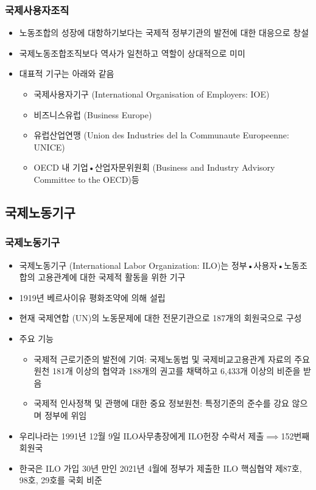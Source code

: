 \documentclass[aspectratio=169,xcolor=dvipsnames,handout]{beamer}
\begin{document}
\begin{frame}
    \frametitle{국제사용자조직}
    \begin{itemize}[<+->]
        \item 노동조합의 성장에 대항하기보다는 국제적 정부기관의 발전에 대한 대응으로 창설
        \item 국제노동조합조직보다 역사가 일천하고 역할이 상대적으로 미미
        \item 대표적 기구는 아래와 같음
        \begin{itemize}
            \item 국제사용자기구 (International Organisation of Employers: IOE)
            \item 비즈니스유럽 (Business Europe)
            \item 유럽산업연맹 (Union des Industries del la Communaute Europeenne: UNICE)
            \item OECD 내 기업•산업자문위원회 (Business and Industry Advisory Committee to the OECD)등
        \end{itemize}
    \end{itemize}
\end{frame}

\subsection{국제노동기구}%

\begin{frame}[allowframebreaks]
    \frametitle{국제노동기구}
    \begin{itemize}[<+->]
        \item 국제노동기구 (International Labor Organization: ILO)는 정부•사용자•노동조합의 고용관계에 대한 국제적 활동을 위한 기구
        \item 1919년 베르사이유 평화조약에 의해 설립
        \item 현재 국제연합 (UN)의 노동문제에 대한 전문기관으로 187개의 회원국으로 구성
        \item 주요 기능
        \begin{itemize}
            \item 국제적 근로기준의 발전에 기여: 국제노동법 및 국제비교고용관계 자료의 주요 원천 181개 이상의 협약과 188개의 권고를 채택하고 6,433개 이상의 비준을 받음       
            \item 국제적 인사정책 및 관행에 대한 중요 정보원천: 특정기준의 준수를 강요 않으며 정부에 위임
        \end{itemize}
        \item 우리나라는 1991년 12월 9일 ILO사무총장에게 ILO헌장 수락서 제출$\implies$152번째 회원국 
        \item 한국은 ILO 가입 30년 만인 2021년 4월에 정부가 제출한 ILO 핵심협약 제87호, 98호, 29호를 국회 비준   
    \end{itemize}
\end{frame}
\end{document}

